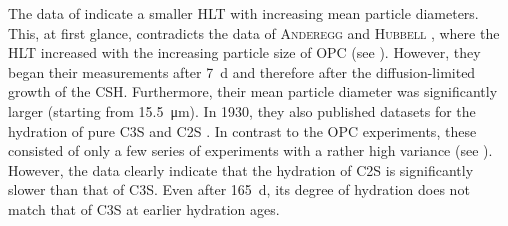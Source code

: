 The data of \textcite{garrault.2006} indicate a smaller \ac{HLT} with increasing mean particle diameters.
This, at first glance, contradicts the data of \textsc{Anderegg} and \textsc{Hubbell} \cite{anderegg.1929,anderegg.1930}, where the \ac{HLT} increased with the increasing particle size of \ac{OPC} (see ).
However, they began their measurements after \qty{7}{\day} and therefore after the diffusion-limited growth of the \ac{CSH}.
Furthermore, their mean particle diameter was significantly larger (starting from \qty{15.5}{\micro\meter}).
In 1930, they also published datasets for the hydration of pure \ac{C3S} and \ac{C2S} \cite{anderegg.1930}.
In contrast to the \ac{OPC} experiments, these consisted of only a few series of experiments with a rather high variance (see ).
However, the data clearly indicate that the hydration of \ac{C2S} is significantly slower than that of \ac{C3S}. Even after \qty{165}{\day}, its degree of hydration does not match that of \ac{C3S} at earlier hydration ages.

